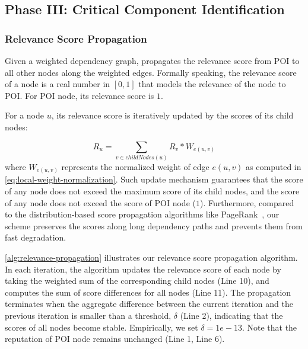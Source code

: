 \subsection{Phase III: Critical Component Identification}
\label{subsec:phase3}




\subsubsection{Relevance Score Propagation}
\label{subsubsec:propagation}

Given a weighted dependency graph, \tool propagates the relevance score from POI to all other nodes along the weighted edges. 
Formally speaking, the relevance score of a node is a real number in $[0, 1]$ that models the relevance of the node to POI. 
For POI node, its relevance score is $1$.

%
For a node $u$, its relevance score is iteratively updated by the scores of its child nodes: 

\begin{equation}
    \label{eq:reputation}
     R_{u} =\sum_{v \in childNodes(u)} R_{v}*W_{e(u,v)}
\end{equation}
where $W_{e(u,v)}$ represents the normalized weight of edge $e(u,v)$ as computed in \cref{eq:local-weight-normalization}.
Such update mechanism guarantees that the score of any node does not exceed the maximum score of its child nodes, and the score of any node does not exceed the score of POI node (\ie $1$).
Furthermore, compared to the distribution-based score propagation algorithms like PageRank~\cite{pagerank}, our scheme preserves the scores along long dependency paths and prevents them from fast degradation.



\cref{alg:relevance-propagation} illustrates our relevance score propagation algorithm. 
In each iteration, the algorithm updates the relevance score of each node by taking the weighted sum of the corresponding child nodes (Line 10), and computes the sum of score differences for all nodes (Line 11).
The propagation terminates when the aggregate difference between the current iteration and the previous iteration is smaller than a threshold, $\delta$ (Line 2), indicating that the scores of all nodes become stable.
Empirically, we set $\delta = 1e-13$.
Note that the reputation of POI node remains unchanged (Line 1, Line 6).



